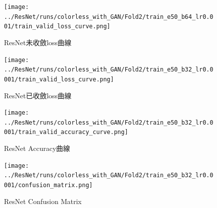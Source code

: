     \begin{figure}[!t]
        \centering
        \texttt{[image: ../ResNet/runs/colorless\_with\_GAN/Fold2/train\_e50\_b64\_lr0.001/train\_valid\_loss\_curve.png]}
        \caption{ResNet未收斂loss曲線}
        \label{fig:ResNet_unconvergence_loss_curve}
    \end{figure}
    \begin{figure}[!t]
        \centering
        \texttt{[image: ../ResNet/runs/colorless\_with\_GAN/Fold2/train\_e50\_b32\_lr0.0001/train\_valid\_loss\_curve.png]}
        \caption{ResNet已收斂loss曲線}
        \label{fig:ResNet_convergence_loss_curve}
    \end{figure}
    \begin{figure}[!t]
        \centering
        \texttt{[image: ../ResNet/runs/colorless\_with\_GAN/Fold2/train\_e50\_b32\_lr0.0001/train\_valid\_accuracy\_curve.png]}
        \caption{ResNet Accuracy曲線}
        \label{fig:ResNet_accuracy_curve}
    \end{figure}
    \begin{figure}[!t]
        \centering
        \texttt{[image: ../ResNet/runs/colorless\_with\_GAN/Fold2/train\_e50\_b32\_lr0.0001/confusion\_matrix.png]}
        \caption{ResNet Confusion Matrix}
        \label{fig:ResNet_confuson_matrix}
    \end{figure}
    
        